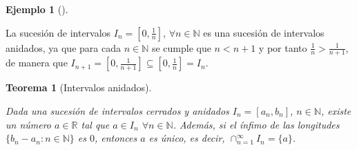 \documentclass[
  a4paper,
]{scrreport}
\theoremstyle{plain}
\theoremstyle{plain}
\newtheorem{theorem}{Teorema}[chapter]
\theoremstyle{definition}
\theoremstyle{definition}
\newtheorem{example}{Ejemplo}[chapter]
\theoremstyle{plain}
\theoremstyle{definition}
\theoremstyle{remark}
\begin{document}
\begin{example}[]\protect\hypertarget{exm-sucesion-intervalos-anidados}{}\label{exm-sucesion-intervalos-anidados}

La sucesión de intervalos \(I_n=[0,\frac{1}{n}]\),
\(\forall n\in\mathbb{N}\) es una sucesión de intervalos anidados, ya
que para cada \(n\in\mathbb{N}\) se cumple que \(n<n+1\) y por tanto
\(\frac{1}{n}>\frac{1}{n+1}\), de manera que
\(I_{n+1}=[0,\frac{1}{n+1}]\subseteq [0,\frac{1}{n}]=I_n\).

\end{example}

\begin{theorem}[Intervalos
anidados]\protect\hypertarget{thm-intervalos-anidados}{}\label{thm-intervalos-anidados}

Dada una sucesión de intervalos cerrados y anidados \(I_n=[a_n,b_n]\),
\(n\in\mathbb{N}\), existe un número \(a\in\mathbb{R}\) tal que
\(a\in I_n\) \(\forall n\in\mathbb{N}\). Además, si el ínfimo de las
longitudes \(\{b_n-a_n: n\in \mathbb{N}\}\) es \(0\), entonces \(a\) es
único, es decir, \(\cap_{n=1}^\infty I_n=\{a\}\).

\end{theorem}
\end{document}
